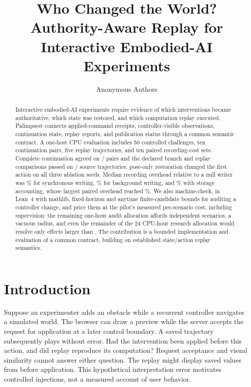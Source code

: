 \documentclass[10pt]{article}
\title{Who Changed the World?\\Authority-Aware Replay for Interactive Embodied-AI Experiments}
\author{Anonymous Authors}
\date{}
\begin{document}
\maketitle
\begin{abstract}
Interactive embodied-AI experiments require evidence of which interventions
became authoritative, which state was restored, and which computation replay
executed. Palimpsest connects applied-command receipts, controller-visible
observations, continuation state, replay reports, and publication status through
a common semantic contract. A one-host CPU evaluation includes 50 controlled
challenges, ten continuation pairs, five replay trajectories, and ten paired
recording-cost sets. Complete continuation agreed on
\ContinuationPassed{}/\ContinuationDeclared{} pairs and the declared branch and
replay comparisons passed on \ReplayPassed{}/\ReplayDeclared{} source trajectories;
pose-only restoration changed the first action on all three ablation seeds.
Median recording overhead relative to a null writer was
\SynchronousOverheadMedian{}\% for synchronous writing,
\BackgroundOverheadMedian{}\% for background writing, and
\StorageOverheadMedian{}\% with storage accounting, whose largest paired
overhead reached \StorageOverheadMaximum{}\%. We also machine-check, in Lean~4
with mathlib, fixed-horizon and anytime finite-candidate bounds for auditing a
controller change, and price them at the pilot's measured per-scenario cost,
including supervision: the remaining one-hour audit allocation affords
\AuditLaneScenarios{} independent scenarios, a vacuous radius, and even the
remainder of the 24 CPU-hour research allocation would resolve only effects
larger than \AuditTotalRadius{}. The contribution is a bounded
implementation and evaluation of a common contract, building on established
state/action replay semantics.
\end{abstract}

\section{Introduction}
Suppose an experimenter adds an obstacle while a recurrent controller navigates
a simulated world. The browser can draw a preview while the server accepts the request
for application at a later control boundary.
A saved trajectory subsequently plays without error. Had the intervention been
applied before this action, and did replay reproduce its computation? Request acceptance
and visual similarity cannot answer either question. The replay might display saved values from before application. This
hypothetical interpretation error motivates controlled injections, not a
measured account of user behavior.
\end{document}
